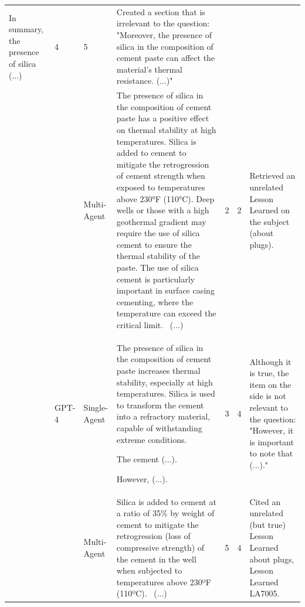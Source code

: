 \begin{landscape}
\begin{table}[h]
\begin{tabular}{| m{3cm} | m{1.5cm} | m{1.5cm} |>{\scriptsize}m{9cm} | m{1.3cm} | m{1.2cm} |>{\scriptsize}m{4cm} |}
            In summary, the presence of silica (...) & 4 & 5 & Created a section that is irrelevant to the question: "Moreover, the presence of silica in the composition of cement paste can affect the material's thermal resistance. (...)" \\
            \cline{3-7}
            &  & Multi-Agent & The presence of silica in the composition of cement paste has a positive effect on thermal stability at high temperatures. Silica is added to cement to mitigate the retrogression of cement strength when exposed to temperatures above 230°F (110°C). Deep wells or those with a high geothermal gradient may require the use of silica cement to ensure the thermal stability of the paste. The use of silica cement is particularly important in surface casing cementing, where the temperature can exceed the critical limit. \ (...) & 2 & 2 & Retrieved an unrelated Lesson Learned on the subject (about plugs). \\ 
            \cline{2-7}
            & GPT-4 & Single-Agent & The presence of silica in the composition of cement paste increases thermal stability, especially at high temperatures. Silica is used to transform the cement into a refractory material, capable of withstanding extreme conditions. 
            
            The cement (...).

            However, (...). & 3 & 4 & Although it is true, the item on the side is not relevant to the question: "However, it is important to note that (...)." \\
            \cline{3-7}
            &  & Multi-Agent & Silica is added to cement at a ratio of 35\% by weight of cement to mitigate the retrogression (loss of compressive strength) of the cement in the well when subjected to temperatures above 230ºF (110ºC). \ (...) & 5 & 4 & Cited an unrelated (but true) Lesson Learned about plugs, Lesson Learned LA7005. \\
            \hline
            \end{tabular}
            \end{table}
        \end{landscape}
            




